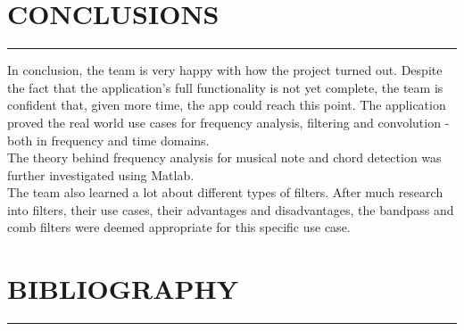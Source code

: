 \documentclass[12pt,a4paper]{article}
\begin{document}
\newpage
\section{CONCLUSIONS}
\vspace{-5mm}
\rule{\linewidth}{0.1mm}
In conclusion, the team is very happy with how the project turned out.
Despite the fact that the application's full functionality is not yet complete, the team
is confident that, given more time, the app could reach this point. 
The application proved the real world use cases for frequency analysis, 
filtering and convolution - both in frequency and time domains.\\
The theory behind frequency analysis for musical note and chord detection was further
investigated using Matlab.\\
The team also learned a lot about different types of filters. After much research into filters,
their use cases, their advantages and disadvantages, the bandpass and comb filters were deemed
appropriate for this specific use case.

\newpage

\small
\section{BIBLIOGRAPHY}
\vspace{-5mm}
\rule{\linewidth}{0.1mm}
\vspace*{-10mm}

\newpage

\Large
\end{document}
